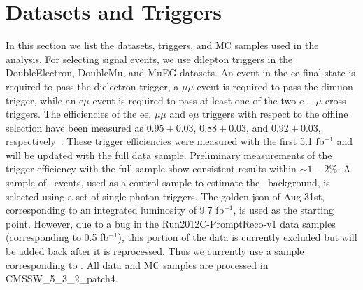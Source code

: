\clearpage

\section{Datasets and Triggers}
\label{sec:datasets}

In this section we list the datasets, triggers, and MC samples used in the analysis. For selecting signal
events, we use dilepton triggers in the DoubleElectron, DoubleMu, and MuEG datasets. 
An event in the ee final state is required to pass the dielectron trigger, a 
$\mu\mu$ event is required to pass the dimuon trigger, while an e$\mu$ event is required to pass at least one 
of the two $e-\mu$ cross triggers. The efficiencies of the ee, $\mu\mu$ and e$\mu$ triggers with respect to the
offline selection have been measured as $0.95\pm0.03$, $0.88\pm0.03$, and $0.92\pm0.03$, respectively~\cite{ref:SSAN}.  
These trigger efficiencies were measured with the first 5.1 fb$^{-1}$ and will be updated with the full data sample. 
Preliminary measurements of the trigger efficiency with the full sample show consistent results within $\sim1-2$\%.
A sample of \gjets\ events, used as a control sample to estimate the \zjets\
background, is selected using a set of single photon triggers.
The golden json of Aug 31st, corresponding to an integrated luminosity of 9.7 fb$^{-1}$, is used as the starting point.
However, due to a bug in the Run2012C-PromptReco-v1 data samples (corresponding to 0.5 fb$^{-1}$), this portion of the data
is currently excluded but will be added back after it is reprocessed. Thus we currently use a sample corresponding to \lumi.
All data and MC samples are processed in CMSSW\_5\_3\_2\_patch4.

